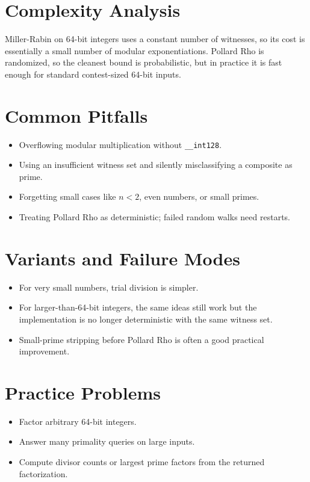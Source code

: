 \section*{Complexity Analysis}

Miller-Rabin on 64-bit integers uses a constant number of witnesses, so its cost is essentially a small number of
modular exponentiations. Pollard Rho is randomized, so the cleanest bound is probabilistic, but in practice it is fast
enough for standard contest-sized 64-bit inputs.

\section*{Common Pitfalls}

\begin{itemize}
  \item Overflowing modular multiplication without \texttt{\_\_int128}.
  \item Using an insufficient witness set and silently misclassifying a composite as prime.
  \item Forgetting small cases like \(n < 2\), even numbers, or small primes.
  \item Treating Pollard Rho as deterministic; failed random walks need restarts.
\end{itemize}

\section*{Variants and Failure Modes}

\begin{itemize}
  \item For very small numbers, trial division is simpler.
  \item For larger-than-64-bit integers, the same ideas still work but the implementation is no longer deterministic with
  the same witness set.
  \item Small-prime stripping before Pollard Rho is often a good practical improvement.
\end{itemize}

\section*{Practice Problems}

\begin{itemize}
  \item Factor arbitrary 64-bit integers.
  \item Answer many primality queries on large inputs.
  \item Compute divisor counts or largest prime factors from the returned factorization.
\end{itemize}

